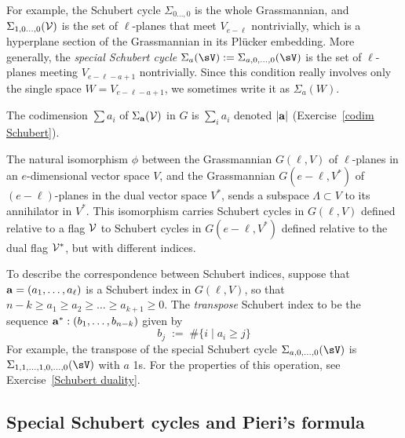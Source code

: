 
 
For example, the Schubert cycle $\Sigma_{0\dots,0}$ is the whole Grassmannian, 
and $\Sigma_{1,0\dots,0}(\cal V)$ is the set of $\ell$-planes that meet $V_{e-\ell}$ nontrivially, which is
a hyperplane section of the Grassmannian in its Pl\"ucker embedding. 
More generally, the
\emph{special Schubert cycle} 
$\Sigma_a(\sV) := \Sigma_{a,0,\dots, 0}(\sV)$ 
is the set of $\ell$-planes
meeting  $V_{e-\ell - a+1}$ nontrivially.
Since this condition really involves only the single space $W = V_{e-\ell-a+1}$, we sometimes 
 write it
as $\Sigma_a(W)$. 

 The codimension $\sum a_i$ of $\Sigma_{\bf a}({\cal V})$ in $G$ is $\sum_i a_i$ denoted $|{\bf a}|$ (Exercise~\ref{codim Schubert}).

The natural isomorphism $\phi$ between the Grassmannian $G(\ell, V)$ of $\ell$-planes in an $e$-dimensional vector space $V$, and the Grassmannian  $G(e-\ell, V^*)$ of $(e-\ell)$-planes in  the dual vector space $V^*$, sends a subspace $\Lambda \subset V$ to its annihilator in $V^*$. This isomorphism carries Schubert cycles in $G(\ell, V)$ defined relative to a flag $\cal V$ to Schubert cycles in $G(e-\ell, V^*)$ defined relative to the dual flag ${\cal V}^*$, but with different indices.

To describe the correspondence between Schubert indices,
suppose that ${\bf a} = (a_1,\dots, a_{\ell})$ is a Schubert index in $G(\ell, V)$, so that $n-k \geq a_1 \geq a_2 \geq \dots \geq a_{k+1} \geq 0$. The \emph{transpose} Schubert index to be the sequence ${\bf a}^*:  (b_1,\dots, b_{n-k})$ given by 
$$
 b_j \; := \; \#\{ i \mid a_i \geq j \}
$$
For example, the transpose of the special Schubert cycle
$\Sigma_{a,0,\dots,0}(\sV)$ is 
$\Sigma_{1,1,\dots,1,0,\dots,0}(\sV)$ with $a$ 1s.
For the properties of this operation, see Exercise~\ref{Schubert duality}.



\subsection{Special Schubert cycles and Pieri's formula}

